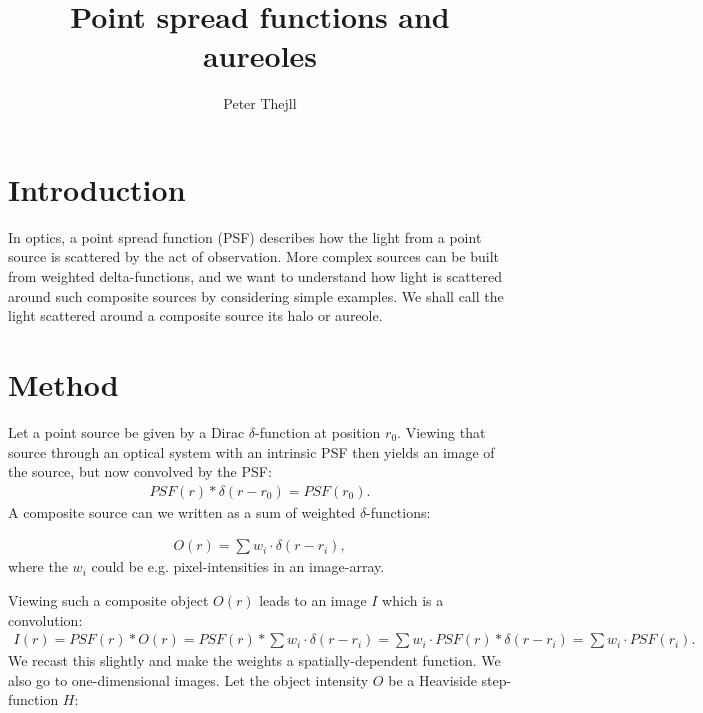 \documentclass[fleqn,14pt]{wlscirep}
\title{Point spread functions and aureoles}
\author[1,*]{Peter Thejll}
\affil[1]{Danish Meteorological Institute, Climate Research, Copenhagen Ø, DK-2100, Denmark}
\affil[*]{pth@dmi.dk}
\begin{document}
\flushbottom
\maketitle
%
%
\thispagestyle{empty}


\section*{Introduction}

In optics, a point spread function (PSF) describes how the light from a point source is scattered by the act of observation. More complex sources can be built from weighted delta-functions, and we want to understand how light is scattered around such composite sources by considering simple examples. We shall call the light scattered around a composite source its halo or aureole.

\section*{Method}

Let a point source be given by a Dirac $\delta$-function at position $r_0$. Viewing that source through an optical system with an intrinsic PSF then yields an image of the source, but now convolved by the PSF:
\begin{eqnarray}
PSF(r)*\delta(r-r_0) = PSF(r_0).
\end{eqnarray}
A composite source can we written as a sum of weighted $\delta$-functions:

\begin{eqnarray}
O(r) = \sum w_i \cdot \delta(r-r_i),
\end{eqnarray}
where the $w_i$ could be e.g. pixel-intensities in an image-array.

Viewing such a composite object $O(r)$ leads to an image $I$ which is a convolution:
\begin{eqnarray}
I(r) = PSF(r)*O(r) = PSF(r)*\sum w_i \cdot \delta(r-r_i) = \sum w_i \cdot PSF(r)*\delta(r-r_i) = \sum w_i \cdot PSF(r_i).
\end{eqnarray}
We recast this slightly and make the weights a spatially-dependent function. We also go to one-dimensional images.
Let the object intensity $O$ be a Heaviside step-function $H$:
 
\end{document}
